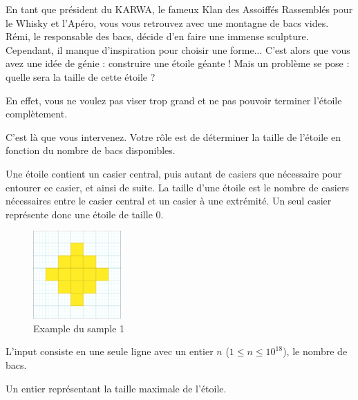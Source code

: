 \problemname{\problemyamlname{}}


En tant que président du KARWA, le fameux Klan des Assoiffés Rassemblés pour le Whisky et l'Apéro, vous vous retrouvez avec une montagne de bacs vides. Rémi, le responsable des bacs, décide d'en faire une immense sculpture. Cependant, il manque d'inspiration pour choisir une forme... 
C'est alors que vous avez une idée de génie : construire une étoile géante ! Mais un problème se pose : quelle sera la taille de cette étoile ?

En effet, vous ne voulez pas viser trop grand et ne pas pouvoir terminer l'étoile complètement.

C'est là que vous intervenez. Votre rôle est de déterminer la taille de l'étoile en fonction du nombre de bacs disponibles.

Une étoile contient un casier central, puis autant de casiers que nécessaire pour entourer ce casier, et ainsi de suite. La taille d'une étoile est le nombre de casiers nécessaires entre le casier central et un casier à une extrémité. Un seul casier représente donc une étoile de taille $0$.

\smallskip
\begin{figure}[h]
    \centering
    \includegraphics[width=0.3\textwidth]{example.png}
    \caption{Example du sample 1}
\end{figure}

\begin{Input}
    L'input consiste en une seule ligne avec un entier $n$ ($1 \leq n \leq 10^{18}$), le nombre de bacs.
\end{Input}

\begin{Output}
    Un entier représentant la taille maximale de l'étoile.
\end{Output}
